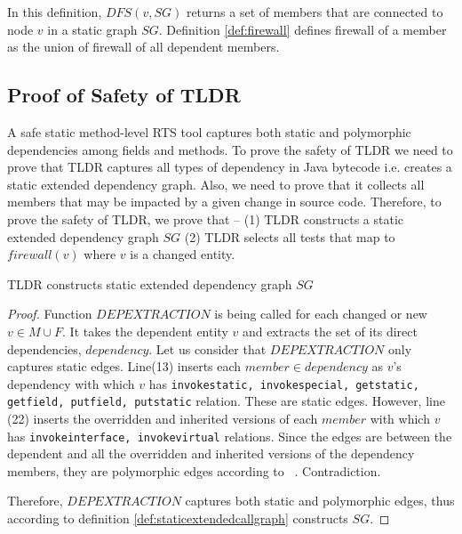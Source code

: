 In this definition, $DFS(v,SG)$ returns a set of members that are connected to node $v$ in a static graph $SG$. Definition \ref{def:firewall} defines firewall of a member as the union of firewall of all dependent members. 

\subsection{Proof of Safety of TLDR}
A safe static method-level RTS tool captures both static and polymorphic dependencies among fields and methods. To prove the safety of TLDR we need to prove that TLDR captures all types of dependency in Java bytecode i.e. creates a static extended dependency graph. Also, we need to prove that it collects all members that may be impacted by a given change in source code. Therefore, to prove the safety of TLDR, we prove that -- (1) TLDR constructs a static extended dependency graph $SG$ (2) TLDR selects all tests that map to $firewall(v)$ where $v$ is a changed entity. 

\begin{theorem}\label{theory}
TLDR constructs static extended dependency graph $SG$
\end{theorem}
\begin{proof}
Function $DEPEXTRACTION$ is being called for each changed or new $v \in M \cup F$. It takes the dependent entity $v$ and extracts the set of its direct dependencies, $dependency$. Let us consider that $DEPEXTRACTION$ only captures static edges. Line(13) inserts each $member \in dependency$ as $v$'s dependency with which $v$ has \texttt{invokestatic, invokespecial, getstatic, getfield, putfield, putstatic} relation. These are static edges. However, line (22) inserts the overridden and inherited versions of each $member$ with which $v$ has \texttt{invokeinterface, invokevirtual} relations. Since the edges are between the dependent and all the overridden and inherited versions of the dependency members, they are polymorphic edges according to ~\cite{sundaresan2000practical}. Contradiction. 

Therefore, $DEPEXTRACTION$ captures both static and polymorphic edges, thus according to definition \ref{def:staticextendedcallgraph} constructs $SG$.
\end{proof}



